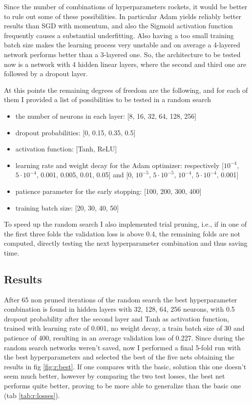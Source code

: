 \documentclass[a4paper, 11pt]{article}
\begin{document}
    Since the number of combinations of hyperparameters rockets, it would be better to rule out some of these possibilities.
    In particular Adam yields reliably better results than SGD with momentum, and also the Sigmoid activation function frequently causes a substantial underfitting. Also having a too small training batch size makes the learning process very unstable and on average a 4-layered network performs better than a 3-layered one. So, the architecture to be tested now is a network with 4 hidden linear layers, where the second and third one are followed by a dropout layer.

    At this points the remaining degrees of freedom are the following, and for each of them I provided a list of possibilities to be tested in a random search
    \begin{itemize}
      \item the number of neurons in each layer: [8, 16, 32, 64, 128, 256]
      \item dropout probabilities: [0, 0.15, 0.35, 0.5]
      \item activation function: [Tanh, ReLU]
      \item learning rate and weight decay for the Adam optimizer: respectively [$10^{-4}$, $5\cdot10^{-4}$, 0.001, 0.005, 0.01, 0.05] and [0, $10^{-5}$, $5\cdot10^{-5}$, $10^{-4}$, $5\cdot10^{-4}$, 0.001]
      \item patience parameter for the early stopping: [100, 200, 300, 400]
      \item training batch size: [20, 30, 40, 50]
    \end{itemize}
    To speed up the random search I also implemented trial pruning, i.e., if in one of the first three folds the validation loss is above 0.4, the remaining folds are not computed, directly testing the next hyperparameter combination and thus saving time.

  \subsection{Results}
    After 65 non pruned iterations of the random search the best hyperparameter combination is found in hidden layers with 32, 128, 64, 256 neurons, with 0.5 dropout probability after the second layer and Tanh as activation function, trained with learning rate of 0.001, no weight decay, a train batch size of 30 and patience of 400, resulting in an average validation loss of 0.227.
    Since during the random search networks weren't saved, now I performed a final 5-fold run with the best hyperparameters and selected the best of the five nets obtaining the results in fig \ref{fig:r:best}. If one compares with the basic, solution this one doesn't seem much better, however by comparing the two test losses, the best net performs quite better, proving to be more able to generalize than the basic one (tab \ref{tab:r:losses}).
\end{document}
